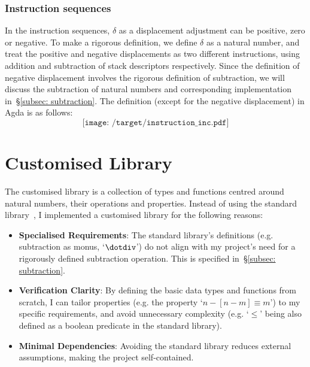 \documentclass[12pt,a4paper]{report}
\theoremstyle{definition}
\newcommand{\secref}[1]{\S\ref{#1}}
\begin{document}
    \subsubsection{Instruction sequences}
    In the instruction sequences, $\delta$ as a displacement adjustment can be positive, zero or negative. To make a rigorous definition, we define $\delta$ as a natural number, and treat the positive and negative displacements as two different instructions, using addition and subtraction of stack descriptors respectively. Since the definition of negative displacement involves the rigorous definition of subtraction, we will discuss the subtraction of natural numbers and corresponding implementation in~\secref{subsec: subtraction}. The definition (except for the negative displacement) in Agda is as follows:
    \[\texttt{[image: /target/instruction\_inc.pdf]}\]


    \section{Customised Library} \label{sec: lib}
    The customised library is a collection of types and functions centred around natural numbers, their operations and properties. Instead of using the standard library~\autocite{agda_std}, I implemented a customised library for the following reasons:
    \begin{itemize}
        \item
            \textbf{Specialised Requirements}: The standard library's definitions (e.g. subtraction as monus, `$\dotdiv$') do not align with my project's need for a rigorously defined subtraction operation. This is specified in~\secref{subsec: subtraction}.
        \item
            \textbf{Verification Clarity}: By defining the basic data types and functions from scratch, I can tailor properties (e.g. the property `$n-[n-m] \equiv m$') to my specific requirements, and avoid unnecessary complexity (e.g. `$\leq$' being also defined as a boolean predicate in the standard library). 
        \item
            \textbf{Minimal Dependencies}: Avoiding the standard library reduces external assumptions, making the project self-contained. 
    \end{itemize}
\end{document}
